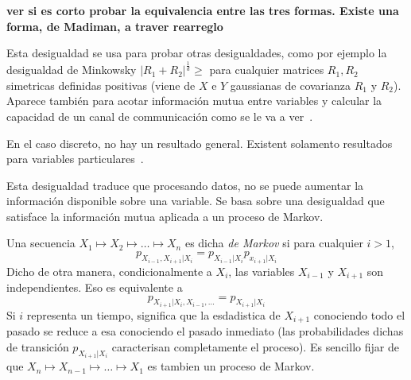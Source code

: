 {\color{red}\bf  ver  si  es  corto   probar  la  equivalencia  entre  las  tres
  formas. Existe una forma, de Madiman, a traver rearreglo}

Esta desigualdad se usa para  probar otras desigualdades, como por ejemplo la
desigualdad de  Minkowsky $|R_1 +  R_2|^{\frac1d} \ge $ para  cualquier matrices
$R_1,  R_2$ simetricas  definidas positivas  (viene de  $X$ e  $Y$  gaussianas de
covarianza $R_1$  y $R_2$).  Aparece  tambi\'en para acotar  informaci\'on mutua
entre variables y  calcular la capacidad de un canal  de communicaci\'on como se
le va a ver~\cite{CovTho06, DemCov91, Rio07, Joh04}.

{\color{red}  En  el  caso  discreto,  no hay  un  resultado  general.  Existent
  solamento resultados para variables particulares~\cite{toto, titi}.}




Esta  desigualdad  traduce  que  procesando  datos,  no  se  puede  aumentar  la
informaci\'on disponible sobre  una variable. Se basa sobre  una desigualdad que
satisface la informaci\'on mutua aplicada a un proceso de Markov.

\begin{definicion}
  Una secuencia  $X_1 \mapsto X_2 \mapsto  \ldots \mapsto X_n$ es  dicha {\it de
    Markov}   si   para  cualquier   $i   >   1$,
  \[
  p_{X_{i-1},X_{i+1}|X_i} = p_{X_{i-1}|X_i} p_{x_{i+1}|X_i}
  \]
  Dicho  de otra  manera, condicionalmente  a $X_i$,  las variables  $X_{i-1}$ y
  $X_{i+1}$       son       independientes.        Eso      es       equivalente
  a
  \[
  p_{X_{i+1}|X_i,X_{i-1},\ldots} = p_{X_{i+1}|X_i}
  \]
  Si  $i$  representa un  tiempo,  significa  que  la esdadistica  de  $X_{i+1}$
  conociendo todo el pasado se reduce  a esa conociendo el pasado inmediato (las
  probabilidades   dichas   de   transici\'on   $p_{X_{i+1}|X_i}$   caracterisan
  completamente  el proceso).   Es sencillo  fijar de  que $X_n  \mapsto X_{n-1}
  \mapsto \ldots \mapsto X_1$ es tambien un proceso de Markov.
\end{definicion}

